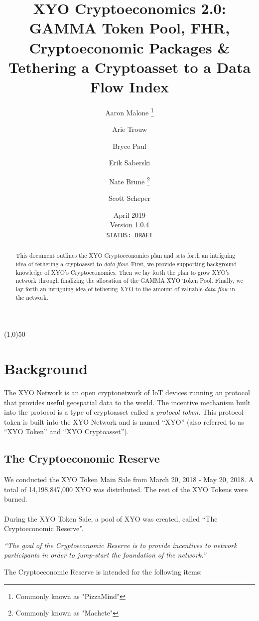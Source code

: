 \documentclass{article}
\title {XYO Cryptoeconomics 2.0: GAMMA Token Pool, FHR, Cryptoeconomic Packages \& Tethering a Cryptoasset to a Data Flow Index}
\author{
    Aaron Malone \thanks{Commonly known as "PizzaMind"}\\
    \and
    Arie Trouw\\
    \and    
    Bryce Paul\\
    \and
    Erik Saberski\\
    \and
    Nate Brune \thanks{Commonly known as "Machete"}\\
    \and
    Scott Scheper\\
}
\date{April 2019 \\ Version 1.0.4\\ \texttt{STATUS: DRAFT}}
\begin{document}
\pagecolor{limegreen}

\maketitle

\begin{center}
\line(1,0){50}
\end{center}

\begin{abstract}
This document outlines the XYO Cryptoeconomics plan and sets forth an intriguing idea of tethering a cryptoasset to \textit{data flow}. First, we provide supporting background knowledge of XYO's Cryptoeconomics. Then we lay forth the plan to grow XYO's network through finalizing the allocation of the GAMMA XYO Token Pool. Finally, we lay forth an intriguing idea of tethering XYO to the amount of valuable \textit{data flow} in the network.
\end{abstract}

\section{Background}
The XYO Network is an open cryptonetwork of IoT devices running an protocol that provides useful geospatial data to the world. The incentive mechanism built into the protocol is a type of cryptoasset called a \textit{protocol token}. This protocol token is built into the XYO Network and is named ``XYO'' (also referred to as ``XYO Token'' and ``XYO Cryptoasset'').

\subsection{The Cryptoeconomic Reserve}
We conducted the XYO Token Main Sale from March 20, 2018 - May 20, 2018. A total of 14,198,847,000 XYO was distributed. The rest of the XYO Tokens were burned.\\
\\During the XYO Token Sale, a pool of XYO was created, called “The Cryptoeconomic Reserve”.

\begin{displayquote}\textit{``The goal of the Cryptoeconomic Reserve is to provide incentives to network participants in order to jump-start the foundation of the network.''} \cite{crypto-reserve}
\end{displayquote}

The Cryptoeconomic Reserve is intended for the following items:
\end{document}
